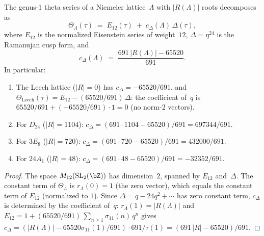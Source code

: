 \begin{proposition}%
\label{prop:lattice:niemeier-theta-decomposition}%
%
%
%
The genus-$1$ theta series of a Niemeier lattice~$\Lambda$
with $|R(\Lambda)|$ roots decomposes as
\begin{equation}\label{eq:niemeier-theta-decomposition}
\Theta_\Lambda(\tau)
\;=\; E_{12}(\tau) \;+\; c_\Delta(\Lambda)\,\Delta(\tau),
\end{equation}
where $E_{12}$ is the normalized Eisenstein series of weight~$12$,
$\Delta = \eta^{24}$ is the Ramanujan cusp form, and
\begin{equation}\label{eq:niemeier-c-delta}
c_\Delta(\Lambda)
\;=\; \frac{691\,|R(\Lambda)| - 65520}{691}.
\end{equation}
In particular:
\begin{enumerate}[label=\textup{(\roman*)}]
\item The Leech lattice \textup{(}$|R| = 0$\textup{)} has
$c_\Delta = -65520/691$, and
$\Theta_{\mathrm{Leech}}(\tau) = E_{12} - (65520/691)\,\Delta$:
the coefficient of~$q$ is
$65520/691 + (-65520/691) \cdot 1 = 0$
\textup{(}no norm-$2$ vectors\textup{)}.
\item For $D_{24}$ \textup{(}$|R| = 1104$\textup{)}:
$c_\Delta = (691 \cdot 1104 - 65520)/691 = 697344/691$.
\item For $3E_8$ \textup{(}$|R| = 720$\textup{)}:
$c_\Delta = (691 \cdot 720 - 65520)/691 = 432000/691$.
\item For $24A_1$ \textup{(}$|R| = 48$\textup{)}:
$c_\Delta = (691 \cdot 48 - 65520)/691 = -32352/691$.
\end{enumerate}
\end{proposition}

\begin{proof}
The space $M_{12}(\mathrm{SL}_2(\bZ))$ has dimension~$2$, spanned
by $E_{12}$ and~$\Delta$. The constant term of $\Theta_\Lambda$ is
$r_\Lambda(0) = 1$ (the zero vector), which equals
the constant term of $E_{12}$ (normalized to $1$).
Since $\Delta = q - 24q^2 + \cdots$ has zero constant term,
$c_\Delta$ is determined by the coefficient of~$q$:
$r_\Lambda(1) = |R(\Lambda)|$ and
$E_{12} = 1 + (65520/691)\,\sum_{n \geq 1} \sigma_{11}(n)\,q^n$
gives $c_\Delta = (|R(\Lambda)| - 65520\sigma_{11}(1)/691) \cdot
691/\tau(1) = (691\,|R| - 65520)/691$.
\end{proof}

